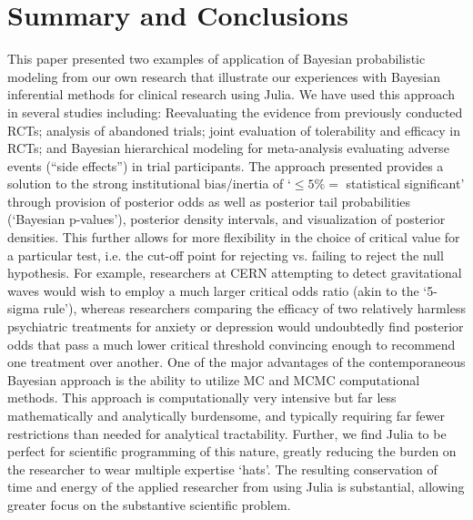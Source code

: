\documentclass{juliacon}
\begin{document}
\section{Summary and Conclusions}
This paper presented two examples of application of Bayesian probabilistic modeling from our own research that illustrate our experiences with Bayesian inferential methods for clinical research using Julia.  We have used this approach in several studies including: Reevaluating the evidence from previously conducted RCTs; analysis of abandoned trials; joint evaluation of tolerability and efficacy in RCTs; and Bayesian hierarchical modeling for meta-analysis evaluating adverse events (“side effects”) in trial participants.
\vskip 6pt
The approach presented provides a solution to the strong institutional bias/inertia of `$\le 5\% =$ statistical significant’ through provision of posterior odds as well as posterior tail probabilities (`Bayesian p-values’), posterior density intervals, and visualization of posterior densities. This further allows for more flexibility in the choice of critical value for a particular test, i.e. the cut-off point for rejecting vs. failing to reject the null hypothesis.  For example, researchers at CERN attempting to detect gravitational waves would wish to employ a much larger critical odds ratio (akin to the `5-sigma rule'), whereas researchers comparing the efficacy of two relatively harmless psychiatric treatments for anxiety or depression would undoubtedly find posterior odds that pass a much lower critical threshold convincing enough to recommend one treatment over another.  
\vskip 6pt
One of the major advantages of the contemporaneous Bayesian approach is 
the ability to utilize MC and MCMC computational methods. This approach is computationally very intensive but far less mathematically and analytically burdensome, and typically requiring far fewer restrictions than needed for analytical tractability.  Further, we find Julia to be  perfect for scientific programming of this nature, greatly reducing the burden on the researcher to wear multiple expertise `hats'. The resulting conservation of time and energy of the applied researcher from using Julia is substantial, allowing greater focus on the substantive scientific problem.

%
%


\end{document}
